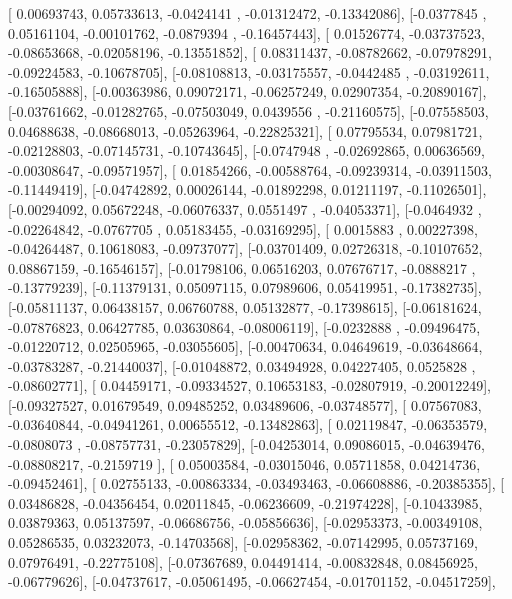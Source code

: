 \documentclass{article}
\begin{document}
       [ 0.00693743,  0.05733613, -0.0424141 , -0.01312472, -0.13342086],
       [-0.0377845 ,  0.05161104, -0.00101762, -0.0879394 , -0.16457443],
       [ 0.01526774, -0.03737523, -0.08653668, -0.02058196, -0.13551852],
       [ 0.08311437, -0.08782662, -0.07978291, -0.09224583, -0.10678705],
       [-0.08108813, -0.03175557, -0.0442485 , -0.03192611, -0.16505888],
       [-0.00363986,  0.09072171, -0.06257249,  0.02907354, -0.20890167],
       [-0.03761662, -0.01282765, -0.07503049,  0.0439556 , -0.21160575],
       [-0.07558503,  0.04688638, -0.08668013, -0.05263964, -0.22825321],
       [ 0.07795534,  0.07981721, -0.02128803, -0.07145731, -0.10743645],
       [-0.0747948 , -0.02692865,  0.00636569, -0.00308647, -0.09571957],
       [ 0.01854266, -0.00588764, -0.09239314, -0.03911503, -0.11449419],
       [-0.04742892,  0.00026144, -0.01892298,  0.01211197, -0.11026501],
       [-0.00294092,  0.05672248, -0.06076337,  0.0551497 , -0.04053371],
       [-0.0464932 , -0.02264842, -0.0767705 ,  0.05183455, -0.03169295],
       [ 0.0015883 ,  0.00227398, -0.04264487,  0.10618083, -0.09737077],
       [-0.03701409,  0.02726318, -0.10107652,  0.08867159, -0.16546157],
       [-0.01798106,  0.06516203,  0.07676717, -0.0888217 , -0.13779239],
       [-0.11379131,  0.05097115,  0.07989606,  0.05419951, -0.17382735],
       [-0.05811137,  0.06438157,  0.06760788,  0.05132877, -0.17398615],
       [-0.06181624, -0.07876823,  0.06427785,  0.03630864, -0.08006119],
       [-0.0232888 , -0.09496475, -0.01220712,  0.02505965, -0.03055605],
       [-0.00470634,  0.04649619, -0.03648664, -0.03783287, -0.21440037],
       [-0.01048872,  0.03494928,  0.04227405,  0.0525828 , -0.08602771],
       [ 0.04459171, -0.09334527,  0.10653183, -0.02807919, -0.20012249],
       [-0.09327527,  0.01679549,  0.09485252,  0.03489606, -0.03748577],
       [ 0.07567083, -0.03640844, -0.04941261,  0.00655512, -0.13482863],
       [ 0.02119847, -0.06353579, -0.0808073 , -0.08757731, -0.23057829],
       [-0.04253014,  0.09086015, -0.04639476, -0.08808217, -0.2159719 ],
       [ 0.05003584, -0.03015046,  0.05711858,  0.04214736, -0.09452461],
       [ 0.02755133, -0.00863334, -0.03493463, -0.06608886, -0.20385355],
       [ 0.03486828, -0.04356454,  0.02011845, -0.06236609, -0.21974228],
       [-0.10433985,  0.03879363,  0.05137597, -0.06686756, -0.05856636],
       [-0.02953373, -0.00349108,  0.05286535,  0.03232073, -0.14703568],
       [-0.02958362, -0.07142995,  0.05737169,  0.07976491, -0.22775108],
       [-0.07367689,  0.04491414, -0.00832848,  0.08456925, -0.06779626],
       [-0.04737617, -0.05061495, -0.06627454, -0.01701152, -0.04517259],
\end{document}
